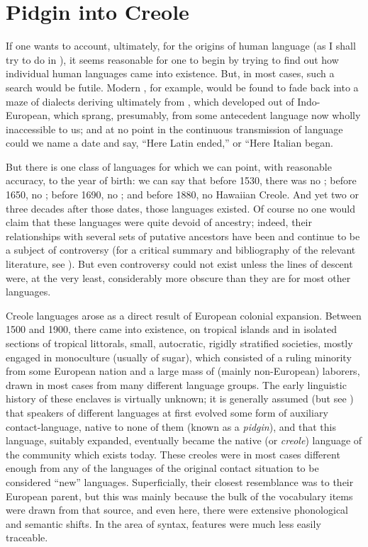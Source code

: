 \chapter{Pidgin into Creole} \label{ch:1}

If one wants to account, ultimately, for the origins of human language (as I shall try to do in ), it seems reasonable for one to begin by trying to find out how individual human languages came into existence. But, in most cases, such a search would be futile. Mod\-ern , for example, would be found to fade back into a maze of dialects deriving ultimately from , which developed out of Indo-European, which sprang, presumably, from some antecedent language now wholly inaccessible to us; and at no point in the continuous transmission of language could we name a date and say, ``Here Latin ended,'' or ``Here Italian began.{\textquotedbl}

But there is one class of languages for which we can point, with reasonable accuracy, to the year of birth: we can say that before 1530, there was no ; before 1650, no ; before 1690, no ; and before 1880, no Hawaiian Creole. And yet two or three decades after those dates, those languages existed. Of course no one would claim that these languages were quite devoid of ancestry; indeed, their relationships with several sets of putative ancestors have been and continue to be a subject of controversy (for a critical sum\-mary and bibliography of the relevant literature, see \citealt{Bickerton1976}).
But even controversy could not exist unless the lines of descent were, at the very least, considerably more obscure than they are for most other languages.

Creole languages arose as a direct result of European colonial expansion. Between 1500 and 1900, there came into existence, on tropical islands and in isolated sections of tropical littorals, small, autocratic, rigidly stratified societies, mostly engaged in monoculture (usually of sugar), which consisted of a ruling minority from some European nation and a large mass of (mainly non-European) laborers, drawn in most cases from many different language groups. The early linguistic history of these enclaves is virtually unknown; it is generally assumed (but see \citealt{Alleyne1971,Alleyne1979}) that speakers of different lan\-guages at first evolved some form of auxiliary contact-language, native to none of them (known as a \textit{pidgin}), and that this language, suitably expanded, eventually became the native (or \textit{creole}) language of the community which exists today. These creoles were in most cases different enough from any of the languages of the original contact situation to be considered ``new'' languages. Superficially, their closest resemblance was to their European parent, but this was mainly because the bulk of the vocabulary items were drawn from that source, and even here, there were extensive phonological and semantic shifts. In the area of syntax, features were much less easily traceable.

